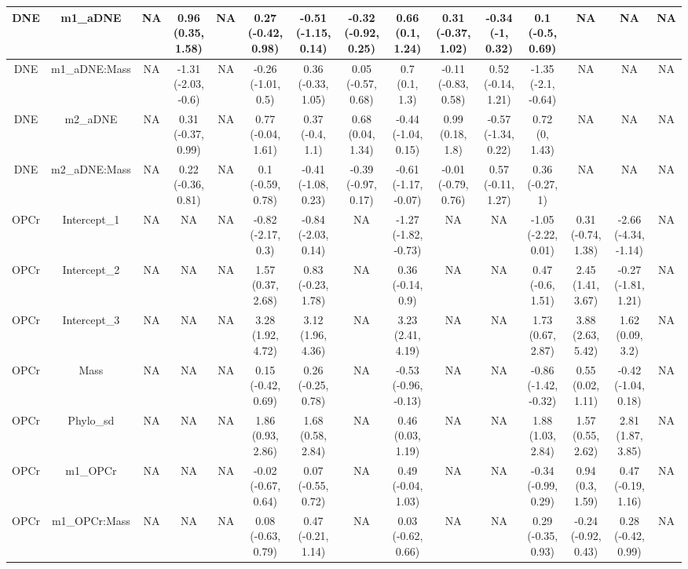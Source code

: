\begin{longtable}[t]{c|c|c|c|c|c|c|c|c|c|c|c|c|c|c}
\hline
DNE & m1_aDNE & NA & 0.96 (0.35, 1.58) & NA & 0.27 (-0.42, 0.98) & -0.51 (-1.15, 0.14) & -0.32 (-0.92, 0.25) & 0.66 (0.1, 1.24) & 0.31 (-0.37, 1.02) & -0.34 (-1, 0.32) & 0.1 (-0.5, 0.69) & NA & NA & NA\\
\hline
DNE & m1_aDNE:Mass & NA & -1.31 (-2.03, -0.6) & NA & -0.26 (-1.01, 0.5) & 0.36 (-0.33, 1.05) & 0.05 (-0.57, 0.68) & 0.7 (0.1, 1.3) & -0.11 (-0.83, 0.58) & 0.52 (-0.14, 1.21) & -1.35 (-2.1, -0.64) & NA & NA & NA\\
\hline
DNE & m2_aDNE & NA & 0.31 (-0.37, 0.99) & NA & 0.77 (-0.04, 1.61) & 0.37 (-0.4, 1.1) & 0.68 (0.04, 1.34) & -0.44 (-1.04, 0.15) & 0.99 (0.18, 1.8) & -0.57 (-1.34, 0.22) & 0.72 (0, 1.43) & NA & NA & NA\\
\hline
DNE & m2_aDNE:Mass & NA & 0.22 (-0.36, 0.81) & NA & 0.1 (-0.59, 0.78) & -0.41 (-1.08, 0.23) & -0.39 (-0.97, 0.17) & -0.61 (-1.17, -0.07) & -0.01 (-0.79, 0.76) & 0.57 (-0.11, 1.27) & 0.36 (-0.27, 1) & NA & NA & NA\\
\hline
OPCr & Intercept_1 & NA & NA & NA & -0.82 (-2.17, 0.3) & -0.84 (-2.03, 0.14) & NA & -1.27 (-1.82, -0.73) & NA & NA & -1.05 (-2.22, 0.01) & 0.31 (-0.74, 1.38) & -2.66 (-4.34, -1.14) & NA\\
\hline
OPCr & Intercept_2 & NA & NA & NA & 1.57 (0.37, 2.68) & 0.83 (-0.23, 1.78) & NA & 0.36 (-0.14, 0.9) & NA & NA & 0.47 (-0.6, 1.51) & 2.45 (1.41, 3.67) & -0.27 (-1.81, 1.21) & NA\\
\hline
OPCr & Intercept_3 & NA & NA & NA & 3.28 (1.92, 4.72) & 3.12 (1.96, 4.36) & NA & 3.23 (2.41, 4.19) & NA & NA & 1.73 (0.67, 2.87) & 3.88 (2.63, 5.42) & 1.62 (0.09, 3.2) & NA\\
\hline
OPCr & Mass & NA & NA & NA & 0.15 (-0.42, 0.69) & 0.26 (-0.25, 0.78) & NA & -0.53 (-0.96, -0.13) & NA & NA & -0.86 (-1.42, -0.32) & 0.55 (0.02, 1.11) & -0.42 (-1.04, 0.18) & NA\\
\hline
OPCr & Phylo_sd & NA & NA & NA & 1.86 (0.93, 2.86) & 1.68 (0.58, 2.84) & NA & 0.46 (0.03, 1.19) & NA & NA & 1.88 (1.03, 2.84) & 1.57 (0.55, 2.62) & 2.81 (1.87, 3.85) & NA\\
\hline
OPCr & m1_OPCr & NA & NA & NA & -0.02 (-0.67, 0.64) & 0.07 (-0.55, 0.72) & NA & 0.49 (-0.04, 1.03) & NA & NA & -0.34 (-0.99, 0.29) & 0.94 (0.3, 1.59) & 0.47 (-0.19, 1.16) & NA\\
\hline
OPCr & m1_OPCr:Mass & NA & NA & NA & 0.08 (-0.63, 0.79) & 0.47 (-0.21, 1.14) & NA & 0.03 (-0.62, 0.66) & NA & NA & 0.29 (-0.35, 0.93) & -0.24 (-0.92, 0.43) & 0.28 (-0.42, 0.99) & NA\\

\end{longtable}

